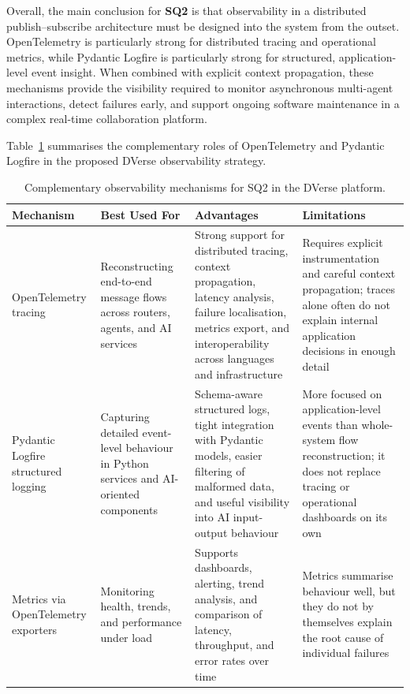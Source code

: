 \documentclass[11pt]{article}
\begin{document}
Overall, the main conclusion for \textbf{SQ2} is that observability in a distributed publish--subscribe architecture must be designed into the system from the outset. OpenTelemetry is particularly strong for distributed tracing and operational metrics, while Pydantic Logfire is particularly strong for structured, application-level event insight. When combined with explicit context propagation, these mechanisms provide the visibility required to monitor asynchronous multi-agent interactions, detect failures early, and support ongoing software maintenance in a complex real-time collaboration platform.

Table~\ref{tab:sq2-observability-tools} summarises the complementary roles of OpenTelemetry and Pydantic Logfire in the proposed DVerse observability strategy.

\begin{table}[H]
    \centering
    \footnotesize
    \renewcommand{\arraystretch}{1.2}
    \begin{tabularx}{\textwidth}{>{\RaggedRight\arraybackslash}p{}>{\RaggedRight\arraybackslash}p{}>{\RaggedRight\arraybackslash}X>{\RaggedRight\arraybackslash}X}
        \rowcolor{dverseblue!15}
        \toprule
        \textbf{Mechanism} & \textbf{Best Used For} & \textbf{Advantages} & \textbf{Limitations} \\
        \midrule
        OpenTelemetry tracing & Reconstructing end-to-end message flows across routers, agents, and AI services & Strong support for distributed tracing, context propagation, latency analysis, failure localisation, metrics export, and interoperability across languages and infrastructure & Requires explicit instrumentation and careful context propagation; traces alone often do not explain internal application decisions in enough detail \\
        Pydantic Logfire structured logging & Capturing detailed event-level behaviour in Python services and AI-oriented components & Schema-aware structured logs, tight integration with Pydantic models, easier filtering of malformed data, and useful visibility into AI input-output behaviour & More focused on application-level events than whole-system flow reconstruction; it does not replace tracing or operational dashboards on its own \\
        Metrics via OpenTelemetry exporters & Monitoring health, trends, and performance under load & Supports dashboards, alerting, trend analysis, and comparison of latency, throughput, and error rates over time & Metrics summarise behaviour well, but they do not by themselves explain the root cause of individual failures \\
        \bottomrule
    \end{tabularx}
    \caption{Complementary observability mechanisms for SQ2 in the DVerse platform.}
    \label{tab:sq2-observability-tools}
\end{table}
\end{document}
